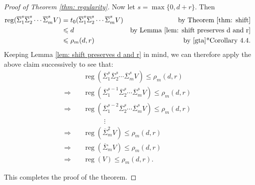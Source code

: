 \documentclass{amsart}
\numberwithin{equation}{section}
\DeclareMathOperator{\reg}{reg}
\newcommand{\SSigma}{{\overline{\Sigma}}}
\begin{document}
\begin{proof}[Proof of Theorem \ref{thm: regularity}]
   Now let $s=\max\{0, d+r\}$. Then
   \begin{align*}
      \reg(\SSigma^s_1 \SSigma^s_2 \cdots \SSigma^s_m V) &= t_0( \SSigma^s_1 \SSigma^s_2 \cdots \SSigma^s_m V ) & \mbox{by Theorem \ref{thm: shift}}\\
      &\leqslant d & \mbox{by Lemma \ref{lem: shift preserves d and r}} \\
      &\leqslant \rho_m(d,r) & \mbox{by \cite{gta}*{Corollary 4.4}}.
   \end{align*} 
   Keeping Lemma \ref{lem: shift preserves d and r} in mind, we can therefore apply the above claim successively to see that:
   \begin{align*}
      & \quad \reg(\SSigma^s_1 \SSigma^s_2 \cdots \SSigma^s_m V) \leqslant \rho_m(d,r) \\
      \Longrightarrow & \quad \reg(\SSigma^{s-1}_1 \SSigma^s_2 \cdots \SSigma^s_m V) \leqslant \rho_m(d,r) \\ 
      \Longrightarrow & \quad \reg(\SSigma^{s-2}_1 \SSigma^s_2 \cdots \SSigma^s_m V) \leqslant \rho_m(d,r) \\ 
      & \qquad\qquad \vdots \\
      \Longrightarrow & \quad \reg(\SSigma^2_m V) \leqslant \rho_m(d,r) \\
      \Longrightarrow & \quad \reg(\SSigma_m V) \leqslant \rho_m(d,r) \\
      \Longrightarrow & \quad \reg(V) \leqslant \rho_m(d,r).
   \end{align*}
   
   This completes the proof of the theorem. 
\end{proof}
\end{document}
